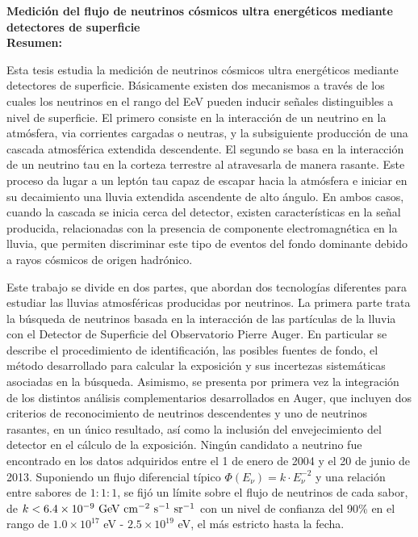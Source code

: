 \begin{titlepage}

$\,$\\[2.5cm]
\textbf{\Large  Medición del flujo de neutrinos cósmicos ultra energéticos mediante detectores de superficie}
$\,$\\[2.5cm]

\noindent
\textbf{Resumen: }

Esta tesis estudia la medici\'on de neutrinos cósmicos ultra energéticos mediante detectores de superficie.
B\'asicamente existen dos mecanismos a trav\'es de los cuales los neutrinos en el rango del EeV pueden inducir señales distinguibles a nivel de superficie.
El primero consiste en la interacción de un neutrino en la atmósfera, via corrientes cargadas o neutras, y la subsiguiente producci\'on de una cascada atmosférica extendida descendente.
El segundo se basa en la interacción de un neutrino tau en la corteza terrestre al atravesarla de manera rasante.
Este proceso da lugar a un leptón tau capaz de escapar hacia la atmósfera e iniciar en su decaimiento una lluvia extendida ascendente de alto \'angulo.
En ambos casos, cuando la cascada se inicia cerca del detector, existen características en la señal producida, relacionadas con la presencia de componente electromagnética en la lluvia, que permiten discriminar este tipo de eventos del fondo dominante debido a rayos cósmicos de origen hadrónico.

Este trabajo se divide en dos partes, que abordan dos tecnolog\'ias diferentes para estudiar las lluvias atmosf\'ericas producidas por neutrinos.
La primera parte trata la b\'usqueda de neutrinos basada en la interacci\'on de las part\'iculas de la lluvia con el Detector de Superficie del Observatorio Pierre Auger.
En particular se describe el procedimiento de identificaci\'on, las posibles fuentes de fondo, el método desarrollado para calcular la exposición y sus incertezas sistemáticas asociadas en la b\'usqueda.
Asimismo, se presenta por primera vez la integración de los distintos análisis complementarios desarrollados en Auger, que incluyen dos criterios de reconocimiento de neutrinos descendentes y uno de neutrinos rasantes, en un único resultado, as\'i como la inclusión del envejecimiento del detector en el cálculo de la exposición.
Ningún candidato a neutrino fue encontrado en los datos adquiridos entre el 1 de enero de 2004 y el 20 de junio de 2013. Suponiendo un flujo diferencial típico $\Phi(E_\nu) = k\cdot E_\nu^{-2}$ y una relación entre sabores de $1:1:1$, se fijó un límite sobre el flujo de neutrinos de cada sabor, de $k < 6.4 \times 10^{-9}~{\rm GeV~cm^{-2}~s^{-1}~sr^{-1}}$ con un nivel de confianza del 90\% en el rango de ${1.0 \times 10^{17}}$ {eV} - ${2.5 \times 10^{19}}$ {eV}, el m\'as estricto hasta la fecha.


\end{titlepage}
